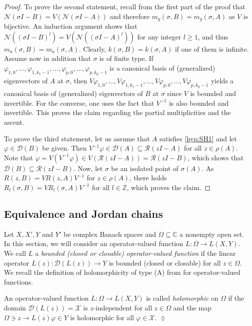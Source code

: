 \documentclass[english]{myarticle}
\begin{document}
\begin{sloppypar}
\begin{proof}
To prove the second statement, recall from the first part of the proof that $\mathcal{N}(\sigma I-B) = V(\mathcal{N}(\sigma I-A))$ and therefore $m_g(\sigma,B) = m_g(\sigma,A)$ as $V$ is bijective. An induction argument shows that $\mathcal{N}((\sigma I-B)^l) = V(\mathcal{N}((\sigma I-A)^l))$ for any integer $l \geq 1$, and thus $m_a(\sigma,B) = m_a(\sigma,A)$. Clearly, $k(\sigma,B)  = k(\sigma,A)$ if one of them is infinite. Assume now in addition that $\sigma$ is of finite type. If $\varphi_{1,0},\dots,\varphi_{1,k_{1}-1},\dots,\varphi_{p,0},\dots,\varphi_{p,k_{p}-1}$ is a canonical basis of (generalized) eigenvectors of $A$ at $\sigma$, then $V\varphi_{1,0},\dots,V\varphi_{1,k_{1}-1},\dots,V\varphi_{p,0},\dots,V\varphi_{p,k_{p}-1}$ yields a canonical basis of (generalized) eigenvectors of $B$ at $\sigma$ since $V$ is bounded and invertible. For the converse, one uses the fact that $V^{-1}$ is also bounded and invertible. This proves the claim regarding the partial multiplicities and the ascent.

To prove the third statement, let us assume that $A$ satisfies \ref{hyp:SH1} and let $\varphi \in \mathcal{D}(B)$ be given. Then $V^{-1}\varphi \in \mathcal{D}(A) \subseteq \mathcal{R}(zI-A)$ for all $z \in \rho(A)$. Note that $\varphi = V(V^{-1} \varphi) \in V(\mathcal{R}(zI-A)) = \mathcal{R}(zI-B)$, which shows that $\mathcal{D}(B) \subseteq \mathcal{R}(zI-B)$. Now, let $\sigma$ be an isolated point of $\sigma(A)$. As $R(z,B) = VR(z,A)V^{-1}$ for $z \in \rho(A)$, there holds $R_l(\sigma,B) = VR_l(\sigma,A)V^{-1}$ for all $l \in \mathbb{Z}$, which proves the claim.
\end{proof}

\subsection{Equivalence and Jordan chains} \label{subsec:equivalence}
Let $X,X',Y$ and $Y'$ be complex Banach spaces and $\Omega \subseteq \mathbb{C}$ a nonempty open set. In this section, we will consider an operator-valued function $L : \Omega \to L(X,Y)$. We call $L$ a \emph{bounded (closed or closable) operator-valued function} if the linear operator $L(z) : \mathcal{D}(L(z)) \to Y$ is bounded (closed or closable) for all $z \in \Omega$. We recall the definition of holomorphicity of type (A) from \cite[Section VII.2.1]{Kato1995} for operator-valued functions.

\begin{definition}
An operator-valued function $L : \Omega \to L(X,Y)$ is called \emph{holomorphic} on $\Omega$ if the domain $\mathcal{D}(L(z)) = \mathcal{X}$ is $z$-independent for all $z \in \Omega$ and the map $\Omega \ni z \to L(z)\varphi \in Y$ is holomorphic for all $\varphi \in \mathcal{X}$. \hfill $\lozenge$
\end{definition}


\end{sloppypar}
\end{document}
